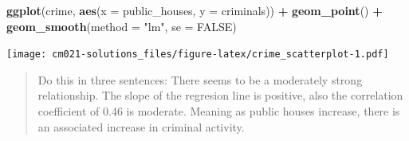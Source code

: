 \documentclass[]{article}
\newenvironment{Shaded}{\begin{snugshade}}{\end{snugshade}}
\newcommand{\DataTypeTok}[1]{\textcolor[rgb]{0.13,0.29,0.53}{#1}}
\newcommand{\KeywordTok}[1]{\textcolor[rgb]{0.13,0.29,0.53}{\textbf{#1}}}
\newcommand{\NormalTok}[1]{#1}
\newcommand{\OperatorTok}[1]{\textcolor[rgb]{0.81,0.36,0.00}{\textbf{#1}}}
\newcommand{\OtherTok}[1]{\textcolor[rgb]{0.56,0.35,0.01}{#1}}
\newcommand{\StringTok}[1]{\textcolor[rgb]{0.31,0.60,0.02}{#1}}
\begin{document}
\begin{Shaded}
\begin{Highlighting}[]
\KeywordTok{ggplot}\NormalTok{(crime, }\KeywordTok{aes}\NormalTok{(}\DataTypeTok{x =}\NormalTok{ public_houses, }\DataTypeTok{y =}\NormalTok{ criminals)) }\OperatorTok{+}
\StringTok{  }\KeywordTok{geom_point}\NormalTok{() }\OperatorTok{+}
\StringTok{  }\KeywordTok{geom_smooth}\NormalTok{(}\DataTypeTok{method =} \StringTok{"lm"}\NormalTok{, }\DataTypeTok{se =} \OtherTok{FALSE}\NormalTok{)}
\end{Highlighting}
\end{Shaded}

\texttt{[image: cm021-solutions\_files/figure-latex/crime\_scatterplot-1.pdf]}

\begin{quote}
Do this in three sentences: There seems to be a moderately strong
relationship. The slope of the regresion line is positive, also the
correlation coefficient of 0.46 is moderate. Meaning as public houses
increase, there is an associated increase in criminal activity.
\end{quote}
\end{document}
